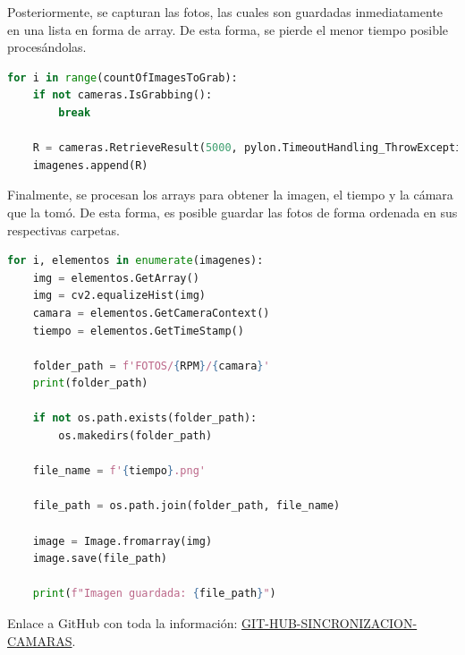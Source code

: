 \documentclass{article}
\begin{document}
\noindent Posteriormente, se capturan las fotos, las cuales son guardadas inmediatamente en una lista en forma de array. De esta forma, se pierde el menor tiempo posible procesándolas.

\begin{lstlisting}[language=Python]
  for i in range(countOfImagesToGrab):
    if not cameras.IsGrabbing():
        break

    R = cameras.RetrieveResult(5000, pylon.TimeoutHandling_ThrowException)
    imagenes.append(R)
\end{lstlisting}

\noindent Finalmente, se procesan los arrays para obtener la imagen, el tiempo y la cámara que la tomó. De esta forma, es posible guardar las fotos de forma ordenada en sus respectivas carpetas.

\begin{lstlisting}[language=Python]
  for i, elementos in enumerate(imagenes):
    img = elementos.GetArray()
    img = cv2.equalizeHist(img)
    camara = elementos.GetCameraContext()
    tiempo = elementos.GetTimeStamp()

    folder_path = f'FOTOS/{RPM}/{camara}'
    print(folder_path)

    if not os.path.exists(folder_path):
        os.makedirs(folder_path)

    file_name = f'{tiempo}.png'

    file_path = os.path.join(folder_path, file_name)

    image = Image.fromarray(img)
    image.save(file_path)

    print(f"Imagen guardada: {file_path}")
\end{lstlisting}

\noindent Enlace a GitHub con toda la información: \href{https://github.com/LukasWolff2002/SINCRONIZACION_CAMARAS_BASLER}{GIT-HUB-SINCRONIZACION-CAMARAS}.
\end{document}
